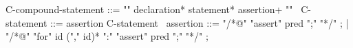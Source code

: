 \begin{syntax}
  C-compound-statement ::= "{" declaration* statement* assertion+ "}"
        \
  C-statement ::= assertion C-statement \
  assertion ::= "/*@" "assert" pred ";" "*/" ;
  | "/*@" "for" id ("," id)* ":" "assert" pred ";" "*/" ;
\end{syntax}
